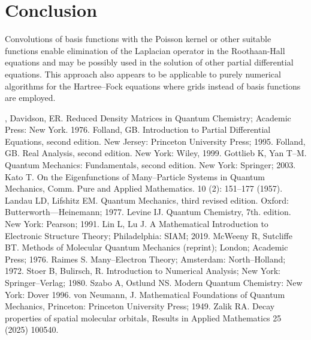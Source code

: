 \documentclass[english, reqno]{amsart}
\begin{document}
\section{Conclusion}
Convolutions of basis functions with the Poisson kernel or other suitable functions enable elimination of the Laplacian operator in the Roothaan-Hall equations and may be possibly used in the solution of other partial differential equations. This approach also appears to be applicable to purely numerical algorithms for the Hartree--Fock equations where grids instead of basis functions are employed. 
\begin{thebibliography},
 Davidson, ER. Reduced Density Matrices in Quantum Chemistry; Academic Press: New York. 1976.
 Folland, GB. Introduction to Partial Differential Equations, second edition. New Jersey: Princeton University Press; 1995.
 Folland, GB. Real Analysis, second edition. New York: Wiley,  1999.
 Gottlieb K, Yan T--M. Quantum Mechanics: Fundamentals, second edition. New York: Springer; 2003.
 Kato T. On the Eigenfunctions of Many--Particle Systems in Quantum Mechanics, Comm. Pure and Applied Mathematics. 10 (2): 151--177 (1957).
 Landau LD, Lifshitz EM. Quantum Mechanics, third revised edition. Oxford: Butterworth---Heinemann; 1977.
 Levine IJ. Quantum Chemistry, 7th. edition.  New York: Pearson; 1991.
 Lin L, Lu J. A Mathematical Introduction to Electronic Structure Theory;  Philadelphia: SIAM; 2019.
 McWeeny R, Sutcliffe BT. Methods of Molecular Quantum Mechanics (reprint);  London; Academic Press; 1976.
 Raimes S. Many--Electron Theory;  Amsterdam: North--Holland; 1972.
 Stoer B, Bulirsch, R. Introduction to Numerical Analysis; New York: Springer--Verlag; 1980.
 Szabo A, Ostlund NS. Modern Quantum Chemistry: New York: Dover 1996.
 von Neumann, J. Mathematical Foundations of Quantum Mechanics, Princeton: Princeton University Press; 1949.
 Zalik RA. Decay properties of spatial molecular orbitals, Results in Applied Mathematics 25 (2025) 100540.
\end{thebibliography}
\end{document}
